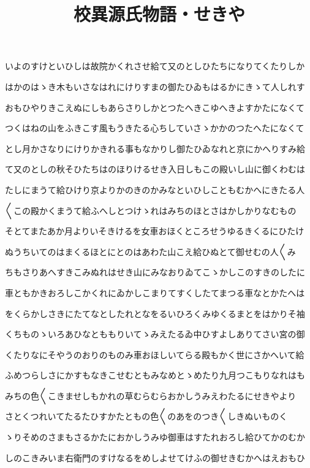 \documentclass[a4paper,11pt,landscape]{ltjtarticle}
\title{校異源氏物語・せきや}
\date{}
\begin{document}
\maketitle

いよのすけといひしは故院かくれさせ給て又のとしひたちになりてくたりしか
\par\medskip
はかのはゝき木もいさなはれにけりすまの御たひゐもはるかにきゝて人しれす
\par\medskip
おもひやりきこえぬにしもあらさりしかとつたへきこゆへきよすかたになくて
\par\medskip
つくはねの山をふきこす風もうきたる心ちしていさゝかかのつたへたになくて
\par\medskip
とし月かさなりにけりかきれる事もなかりし御たひゐなれと京にかへりすみ給
\par\medskip
て又のとしの秋そひたちはのほりけるせき入日しもこの殿いし山に御くわむは
\par\medskip
たしにまうて給ひけり京よりかのきのかみなといひしこともむかへにきたる人
\par\medskip
〱この殿かくまうて給ふへしとつけゝれはみちのほとさはかしかりなむもの
\par\medskip
そとてまたあか月よりいそきけるを女車おほくところせうゆるきくるにひたけ
\par\medskip
ぬうちいてのはまくるほとにとのはあわた山こえ給ひぬとて御せむの人〱み
\par\medskip
ちもさりあへすきこみぬれはせき山にみなおりゐてこゝかしこのすきのしたに
\par\medskip
車ともかきおろしこかくれにゐかしこまりてすくしたてまつる車なとかたへは
\par\medskip
をくらかしさきにたてなとしたれとなをるいひろくみゆくるまとをはかりそ袖
\par\medskip
くちものゝいろあひなとももりいてゝみえたるゐ中ひすよしありてさい宮の御
\par\medskip
くたりなにそやうのおりのものみ車おほしいてらる殿もかく世にさかへいて給
\par\medskip
ふめつらしさにかすもなきこせむともみなめとゝめたり九月つこもりなれはも
\par\medskip
みちの色〱こきませしもかれの草むらむらおかしうみえわたるにせきやより
\par\medskip
さとくつれいてたるたひすかたともの色〱のあをのつき〱しきぬいものく
\par\medskip
ゝりそめのさまもさるかたにおかしうみゆ御車はすたれおろし給ひてかのむか
\par\medskip
しのこきみいま右衛門のすけなるをめしよせてけふの御せきむかへはえおもひ
\end{document}
